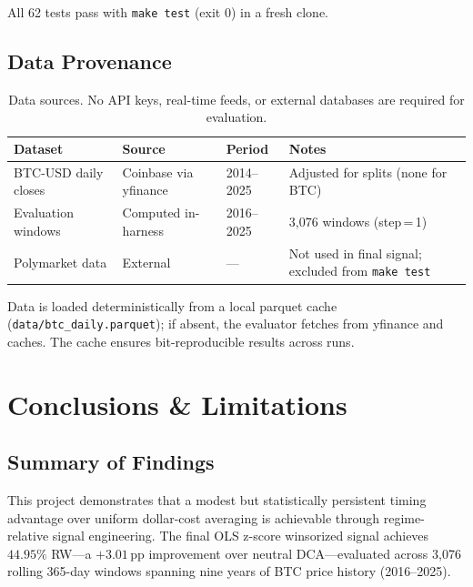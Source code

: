 \documentclass[11pt,letterpaper]{article}
\begin{document}
All 62 tests pass with \texttt{make test} (exit 0) in a fresh clone.

\subsection{Data Provenance}

\begin{table}[H]
  \centering
  \caption{Data sources.  No API keys, real-time feeds, or external databases
           are required for evaluation.}
  \label{tab:data}
  \begin{tabular}{p{3.5cm}p{3cm}p{2cm}p{4cm}}
    \toprule
    \textbf{Dataset} & \textbf{Source} & \textbf{Period} & \textbf{Notes} \\
    \midrule
    BTC-USD daily closes & Coinbase via yfinance & 2014--2025
      & Adjusted for splits (none for BTC) \\
    Evaluation windows & Computed in-harness & 2016--2025
      & 3,076 windows (step\,=\,1) \\
    Polymarket data & External & ---
      & Not used in final signal; excluded from \texttt{make test} \\
    \bottomrule
  \end{tabular}
\end{table}

Data is loaded deterministically from a local parquet cache
(\texttt{data/btc\_daily.parquet}); if absent, the evaluator fetches from
yfinance and caches.  The cache ensures bit-reproducible results across runs.

\section{Conclusions \& Limitations}

\subsection{Summary of Findings}

This project demonstrates that a modest but statistically persistent timing
advantage over uniform dollar-cost averaging is achievable through regime-relative
signal engineering.  The final OLS z-score winsorized signal achieves
$\mathbf{44.95\%}$ RW---a $+3.01$\,pp improvement over neutral DCA---evaluated
across 3,076 rolling 365-day windows spanning nine years of BTC price history
(2016--2025).
\end{document}
